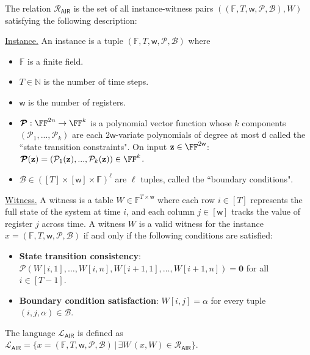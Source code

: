\begin{definition}
The relation $\mathcal{R}_\mathsf{AIR}$ is the set of all instance-witness pairs $((\mathbb{F}, T, \mathsf{w}, \boldsymbol{\mathcal{P}}, \boldsymbol{\mathcal{B}}), W)$ satisfying the following description:

\noindent\underline{Instance.} An instance is a tuple $(\mathbb{F}, T, \mathsf{w}, \boldsymbol{\mathcal{P}}, \boldsymbol{\mathcal{B}})$ where
\begin{itemize}\itemsep0pt
    \item $\mathbb{F}$ is a finite field.
    \item $T \in \mathbb{N}$ is the number of time steps.
    \item $\mathsf{w}$ is the number of registers.
    \item $\boldsymbol{\mathcal{P}}: \FF^{2n} \rightarrow \FF^k$ %
    is a polynomial vector function whose $k$ components $(\mathcal{P}_1,...,\mathcal{P}_k)$ are each $2\mathsf{w}$-variate polynomials of degree at most $\mathsf{d}$ called the ``state transition constraints". On input $\mathbf{z} \in \FF^{2\mathsf{w}}$: $\boldsymbol{\mathcal{P}}(\mathbf{z}) = (\mathcal{P}_1(\mathbf{z}),...,\mathcal{P}_k(\mathbf{z})) \in \FF^k$. 
    \item $\boldsymbol{\mathcal{B}} \in ([T] \times [\mathsf{w}] \times \mathbb{F})^\ell$ are $\ell$ tuples, called the ``boundary conditions".
\end{itemize}

\noindent\underline{Witness.} A witness is a table $W \in \mathbb{F}^{T \times \mathsf{w}}$ where each row $i \in [T]$ represents the full state of the system at time $i$, and each column $j \in [\mathsf{w}]$ tracks the value of register $j$ across time. A witness $W$ is a valid witness for the instance $x = (\mathbb{F}, T, \mathsf{w}, \boldsymbol{\mathcal{P}}, \boldsymbol{\mathcal{B}})$ if and only if the following conditions are satisfied:
\begin{itemize}\itemsep0pt
    \item \textbf{State transition consistency}: $\boldsymbol{\mathcal{P}}(W[i,1], \ldots, W[i,n], W[i+1, 1], \ldots, W[i+1,n]) = \boldsymbol{0}$ for all $i \in [T-1]$.
    \item \textbf{Boundary condition satisfaction}: $W[i,j] = \alpha$ for every tuple $(i, j, \alpha) \in \boldsymbol{\mathcal{B}}$.
\end{itemize}

The language $\mathcal{L}_\mathsf{AIR}$ is defined as $\mathcal{L}_\mathsf{AIR} = \{x=(\mathbb{F}, T, \mathsf{w}, \boldsymbol{\mathcal{P}}, \boldsymbol{\mathcal{B}}) \, | \, \exists W \, (x,W) \in \mathcal{R}_\mathsf{AIR}\}$.
\end{definition}

